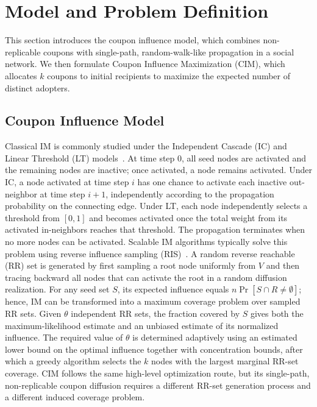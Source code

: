 \documentclass[sigconf,balance=false]{acmart}
\begin{document}
\section{Model and Problem Definition}
\label{sec:model}

This section introduces the coupon influence model, which combines
non-replicable coupons with single-path, random-walk-like propagation in a
social network. We then formulate Coupon Influence Maximization (CIM), which
allocates $k$ coupons to initial recipients to maximize the expected number of
distinct adopters.

\subsection{Coupon Influence Model}

Classical IM is commonly studied under the Independent Cascade (IC) and
Linear Threshold (LT) models~\cite{kempe2003maximizing}.
At time step $0$, all seed nodes are activated and the remaining nodes
are inactive; once activated, a node remains activated.
Under IC, a node activated at time step $i$ has one chance to activate
each inactive out-neighbor at time step $i+1$, independently according
to the propagation probability on the connecting edge.
Under LT, each node independently selects a threshold from $[0,1]$ and
becomes activated once the total weight from its activated in-neighbors
reaches that threshold.
The propagation terminates when no more nodes can be activated.
Scalable IM algorithms typically solve this problem using reverse
influence sampling (RIS)~\cite{borgs2014maximizing,tang2015influence}.
A random reverse reachable (RR) set is generated by first sampling a root
node uniformly from $V$ and then tracing backward all nodes that can
activate the root in a random diffusion realization.
For any seed set $S$, its expected influence equals
$n\Pr[S\cap R\neq\emptyset]$; hence, IM can be transformed into a maximum
coverage problem over sampled RR sets.
Given $\theta$ independent RR sets, the fraction covered by $S$ gives
both the maximum-likelihood estimate and an unbiased estimate of its
normalized influence.
The required value of $\theta$ is determined adaptively using an
estimated lower bound on the optimal influence together with
concentration bounds, after which a greedy algorithm selects the $k$
nodes with the largest marginal RR-set coverage.
CIM follows the same high-level optimization route, but its single-path,
non-replicable coupon diffusion requires a different RR-set generation
process and a different induced coverage problem.
\end{document}

